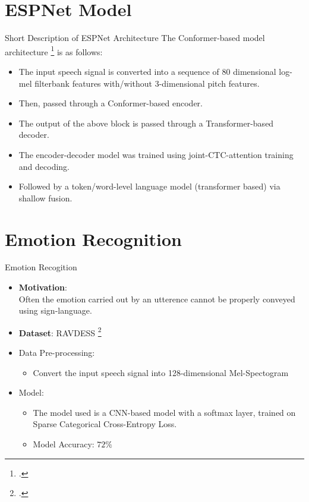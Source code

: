 \documentclass[10pt]{beamer}
\begin{document}
\section{ESPNet Model}
\begin{frame}{Short Description of ESPNet Architecture }
The Conformer-based model architecture \footcite{espnet} is as follows:
\begin{itemize}
	\item The input speech signal is converted into a sequence of 80 dimensional log-mel filterbank features with/without 3-dimensional pitch features.
	\item Then, passed through a Conformer-based encoder.
	\item The output of the above block is passed through a Transformer-based decoder.
	\item The encoder-decoder model was trained using joint-CTC-attention training and decoding.
	\item Followed by a token/word-level language model (transformer based) via shallow fusion.
\end{itemize}
\end{frame}

\section{Emotion Recognition}
\begin{frame}{Emotion Recogition}
\begin{itemize}
	\item \textbf{Motivation}:\\
	Often the emotion carried out by an utterence cannot be properly conveyed using sign-language.
	\item \textbf{Dataset}: RAVDESS \footcite{ravdess}
	\item Data Pre-processing:
	\begin{itemize}
		\item Convert the input speech signal into 128-dimensional Mel-Spectogram
	\end{itemize}
	\item Model:
	\begin{itemize}
		\item The model used is a CNN-based model with a softmax layer, trained on Sparse Categorical Cross-Entropy Loss.
		\item Model Accuracy: $72\%$
		
	\end{itemize}
\end{itemize}
\end{frame}
\end{document}
